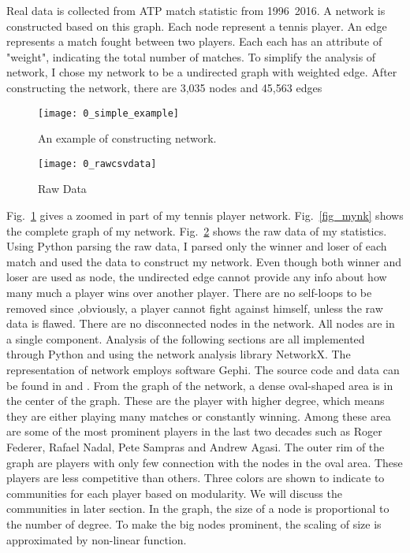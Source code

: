 \documentclass[runningheads]{llncs}
\begin{document}
Real data is collected from ATP match statistic from 1996~2016. A network is constructed based on this graph. 
Each node represent a tennis player. An edge represents a match fought between two players. Each each has an attribute of "weight", indicating the total number of matches.
To simplify the analysis of network, I chose my network to be a undirected graph with weighted edge.
After constructing the network, there are 3,035 nodes and 45,563 edges

\begin{figure}[H]
\centering
\texttt{[image: 0\_simple\_example]}
\caption{An example of constructing network.} \label{fig_0_simple_example}
\end{figure}

\begin{figure}[H]
\texttt{[image: 0\_rawcsvdata]}
\caption{Raw Data} \label{fig_rawdata}
\end{figure}


Fig.~\ref{fig_0_simple_example} gives a zoomed in part of my tennis player network.
Fig.~\ref{fig_mynk} shows the complete graph of my network.
Fig.~\ref{fig_rawdata} shows the raw data of my statistics. Using Python parsing the raw data, I parsed only the winner and loser of each match and used the data to construct my network.
Even though both winner and loser are used as node, the undirected edge cannot provide any info about how many much a player wins over another player. There are no self-loops to be removed since ,obviously, a player cannot fight against himself, unless the raw data is flawed. There are no disconnected nodes in the network. All nodes are in a single component. Analysis of the following sections are all implemented through Python and using the network analysis library NetworkX. The representation of network employs software Gephi. The source code and data can be found in \cite{ref_url1} and \cite{ref_url2}. 
From the graph of the network, a dense oval-shaped area is in the center of the graph. These are the player with higher degree, which means they are either playing many matches or constantly winning. Among these area are some of the most prominent players in the last two decades such as Roger Federer, Rafael Nadal, Pete Sampras and Andrew Agasi. The outer rim of the graph are players with only few connection with the nodes in the oval area. These players are less competitive than others. Three colors are shown to indicate to communities for each player based on modularity. We will discuss the communities in later section. In the graph, the size of a node is proportional to the number of degree. To make the big nodes prominent, the scaling of size is approximated by non-linear function.
\end{document}
